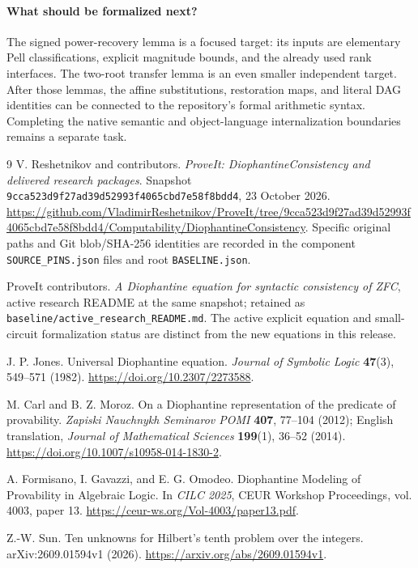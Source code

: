 \documentclass[11pt,letterpaper]{article}
\theoremstyle{remark}
\begin{document}
\paragraph{What should be formalized next?}
The signed power-recovery lemma is a focused target: its inputs are
elementary Pell classifications, explicit magnitude bounds, and the
already used rank interfaces.  The two-root transfer lemma is an even
smaller independent target.  After those lemmas, the affine substitutions,
restoration maps, and literal DAG identities can be connected to the
repository's formal arithmetic syntax.  Completing the native semantic
and object-language internalization boundaries remains a separate task.

\begin{thebibliography}{9}
V. Reshetnikov and contributors.
\emph{ProveIt: DiophantineConsistency and delivered research packages}.
Snapshot \texttt{9cca523d9f27ad39d52993f4065cbd7e58f8bdd4}, 23 October 2026.
\url{https://github.com/VladimirReshetnikov/ProveIt/tree/9cca523d9f27ad39d52993f4065cbd7e58f8bdd4/Computability/DiophantineConsistency}.
Specific original paths and Git blob/SHA-256 identities are recorded in
the component \texttt{SOURCE\_PINS.json} files and root \texttt{BASELINE.json}.

ProveIt contributors.
\emph{A Diophantine equation for syntactic consistency of ZFC}, active
research README at the same snapshot; retained as
\texttt{baseline/active\_research\_README.md}.
The active explicit equation and small-circuit formalization status are
distinct from the new equations in this release.

J. P. Jones.
Universal Diophantine equation.
\emph{Journal of Symbolic Logic} \textbf{47}(3), 549--571 (1982).
\url{https://doi.org/10.2307/2273588}.

M. Carl and B. Z. Moroz.
On a Diophantine representation of the predicate of provability.
\emph{Zapiski Nauchnykh Seminarov POMI} \textbf{407}, 77--104 (2012);
English translation, \emph{Journal of Mathematical Sciences}
\textbf{199}(1), 36--52 (2014).
\url{https://doi.org/10.1007/s10958-014-1830-2}.

A. Formisano, I. Gavazzi, and E. G. Omodeo.
Diophantine Modeling of Provability in Algebraic Logic.
In \emph{CILC 2025}, CEUR Workshop Proceedings, vol. 4003, paper 13.
\url{https://ceur-ws.org/Vol-4003/paper13.pdf}.

Z.-W. Sun.
Ten unknowns for Hilbert's tenth problem over the integers.
arXiv:2609.01594v1 (2026).
\url{https://arxiv.org/abs/2609.01594v1}.
\end{thebibliography}
\end{document}
